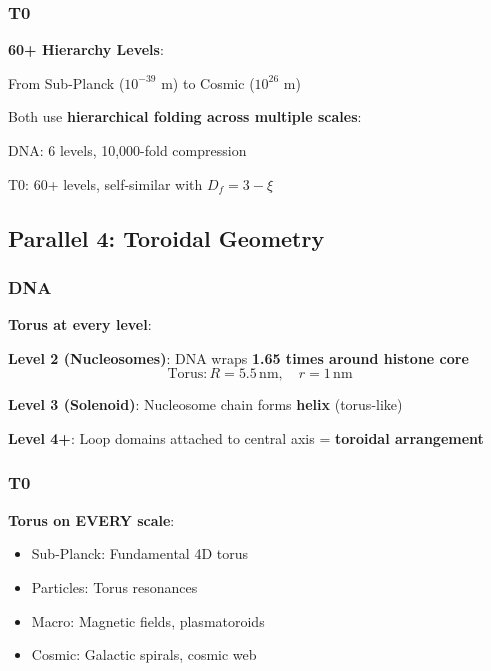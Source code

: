	\subsubsection{T0}
	
	\textbf{60+ Hierarchy Levels}:
	
	From Sub-Planck ($10^{-39}$ m) to Cosmic ($10^{26}$ m)
	
	\begin{keyresult}
		Both use \textbf{hierarchical folding across multiple scales}:
		
		DNA: 6 levels, 10,000-fold compression
		
		T0: 60+ levels, self-similar with $D_f = 3-\xi$
	\end{keyresult}
	
	\subsection{Parallel 4: Toroidal Geometry}
	
	\subsubsection{DNA}
	
	\textbf{Torus at every level}:
	
	\textbf{Level 2 (Nucleosomes)}: DNA wraps \textbf{1.65 times around histone core}
	\begin{equation}
		\text{Torus}: R = 5.5\,\text{nm}, \quad r = 1\,\text{nm}
	\end{equation}
	
	\textbf{Level 3 (Solenoid)}: Nucleosome chain forms \textbf{helix} (torus-like)
	
	\textbf{Level 4+}: Loop domains attached to central axis = \textbf{toroidal arrangement}
	
	\subsubsection{T0}
	
	\textbf{Torus on EVERY scale}:
	\begin{itemize}
		\item Sub-Planck: Fundamental 4D torus
		\item Particles: Torus resonances
		\item Macro: Magnetic fields, plasmatoroids
		\item Cosmic: Galactic spirals, cosmic web
	\end{itemize}
	
